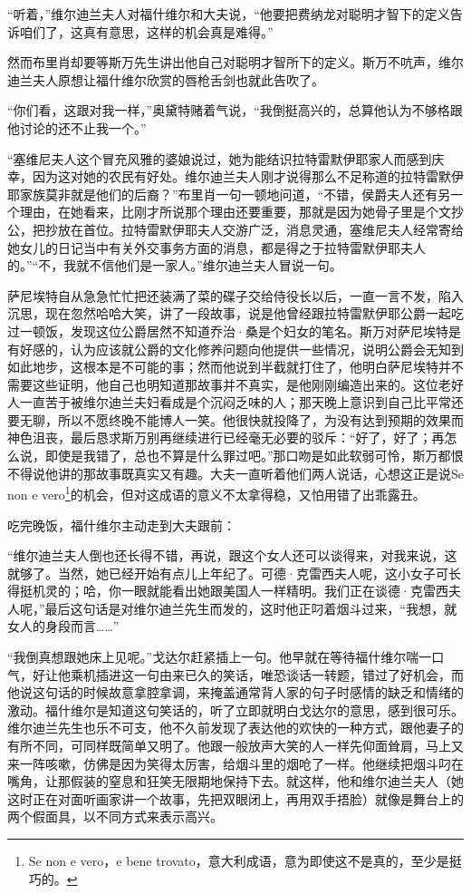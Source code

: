 \par “听着，”维尔迪兰夫人对福什维尔和大夫说，“他要把费纳龙对聪明才智下的定义告诉咱们了，这真有意思，这样的机会真是难得。”
\par 然而布里肖却要等斯万先生讲出他自己对聪明才智所下的定义。斯万不吭声，维尔迪兰夫人原想让福什维尔欣赏的唇枪舌剑也就此告吹了。
\par “你们看，这跟对我一样，”奥黛特赌着气说，“我倒挺高兴的，总算他认为不够格跟他讨论的还不止我一个。”
\par “塞维尼夫人这个冒充风雅的婆娘说过，她为能结识拉特雷默伊耶家人而感到庆幸，因为这对她的农民有好处。维尔迪兰夫人刚才说得那么不足称道的拉特雷默伊耶家族莫非就是他们的后裔？”布里肖一句一顿地问道，“不错，侯爵夫人还有另一个理由，在她看来，比刚才所说那个理由还要重要，那就是因为她骨子里是个文抄公，把抄放在首位。拉特雷默伊耶夫人交游广泛，消息灵通，塞维尼夫人经常寄给她女儿的日记当中有关外交事务方面的消息，都是得之于拉特雷默伊耶夫人的。”“不，我就不信他们是一家人。”维尔迪兰夫人冒说一句。
\par 萨尼埃特自从急急忙忙把还装满了菜的碟子交给侍役长以后，一直一言不发，陷入沉思，现在忽然哈哈大笑，讲了一段故事，说是他曾经跟拉特雷默伊耶公爵一起吃过一顿饭，发现这位公爵居然不知道乔治·桑是个妇女的笔名。斯万对萨尼埃特是有好感的，认为应该就公爵的文化修养问题向他提供一些情况，说明公爵会无知到如此地步，这根本是不可能的事；然而他说到半截就打住了，他明白萨尼埃特并不需要这些证明，他自己也明知道那故事并不真实，是他刚刚编造出来的。这位老好人一直苦于被维尔迪兰夫妇看成是个沉闷乏味的人；那天晚上意识到自己比平常还要无聊，所以不愿终晚不能博人一笑。他很快就投降了，为没有达到预期的效果而神色沮丧，最后恳求斯万别再继续进行已经毫无必要的驳斥：“好了，好了；再怎么说，即使是我错了，总也不算是什么罪过吧。”那口吻是如此软弱可怜，斯万都恨不得说他讲的那故事既真实又有趣。大夫一直听着他们两人说话，心想这正是说Se non e vero\footnote{Se non e vero，e bene trovato，意大利成语，意为即使这不是真的，至少是挺巧的。}的机会，但对这成语的意义不太拿得稳，又怕用错了出乖露丑。
\par 吃完晚饭，福什维尔主动走到大夫跟前：
\par “维尔迪兰夫人倒也还长得不错，再说，跟这个女人还可以谈得来，对我来说，这就够了。当然，她已经开始有点儿上年纪了。可德·克雷西夫人呢，这小女子可长得挺机灵的；哈，你一眼就能看出她跟美国人一样精明。我们正在谈德·克雷西夫人呢，”最后这句话是对维尔迪兰先生而发的，这时他正叼着烟斗过来，“我想，就女人的身段而言……”
\par “我倒真想跟她床上见呢。”戈达尔赶紧插上一句。他早就在等待福什维尔喘一口气，好让他乘机插进这一句由来已久的笑话，唯恐谈话一转题，错过了好机会，而他说这句话的时候故意拿腔拿调，来掩盖通常背人家的句子时感情的缺乏和情绪的激动。福什维尔是知道这句笑话的，听了立即就明白戈达尔的意思，感到很可乐。维尔迪兰先生也乐不可支，他不久前发现了表达他的欢快的一种方式，跟他妻子的有所不同，可同样既简单又明了。他跟一般放声大笑的人一样先仰面耸肩，马上又来一阵咳嗽，仿佛是因为笑得太厉害，给烟斗里的烟呛了一样。他继续把烟斗叼在嘴角，让那假装的窒息和狂笑无限期地保持下去。就这样，他和维尔迪兰夫人（她这时正在对面听画家讲一个故事，先把双眼闭上，再用双手捂脸）就像是舞台上的两个假面具，以不同方式来表示高兴。
